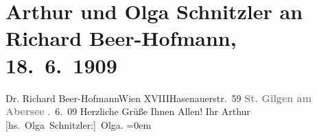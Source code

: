 

         
         \renewcommand{\erwaehntePersonen}{Personen: Richard Beer-Hofmann}
         \renewcommand{\erwaehnteOrte}{Orte: Hasenauerstraße, St. Gilgen, Wien, XVIII., Währing}
         \renewcommand{\erwaehnteWerke}{}
               \section[Arthur und Olga Schnitzler an Richard Beer-Hofmann, 18. 6. 1909]{ Arthur und Olga Schnitzler an Richard Beer-Hofmann, 18. 6. 1909}\nopagebreak{}\rehead{ }\begin{ledgroupsized}[t]{13cm}\normalsize\beginnumbering \toendnotes[C]{\smallbreak\pagebreak[2]} 
\pstart{}{\pb}Dr. Richard Beer-Hofmann\pend{}\pstart{}Wien XVIII\pend{}\pstart{}Hasenauerstr. 59\pend{}{\bigskip}\pstart
           \noindent{}\centering{}{\pb}\textcolor{gray}{\textbf{St. Gilgen am Abersee}}\pend
           . 6. 09\pend
           \pstart
           Herzliche Grüße Ihnen Allen!\pend
           \pstart
           Ihr \spacefill\mbox{Arthur}{\\[\baselineskip]}\spacefill\mbox{{[}hs. Olga Schnitzler:{]} Olga.}\pend
           \leftskip=0em{}
         
         \endnumbering{}\end{ledgroupsized}  \newcommand{\dateiname}{L01845}\newcommand{\titel}{Arthur und Olga Schnitzler an Richard Beer-Hofmann, 18. 6. 1909}\newcommand{\editorInnen}{Martin Anton Müller und Gerd-Hermann Susen}
      